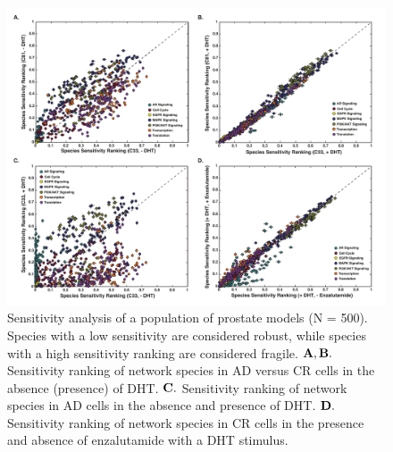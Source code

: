 \documentclass[12pt]{article}
\begin{document}
\clearpage

\begin{figure}\centering
\includegraphics[width=1.0\textwidth]{./figs/Fig_5_Sensitivity.pdf}
\caption{Sensitivity analysis of a population of prostate models (N = 500). Species with a low sensitivity are considered robust, while species with a high sensitivity ranking are considered fragile. $\bf{A,B.}$ Sensitivity ranking of network species in AD versus CR cells in the absence (presence) of DHT. $\bf{C.}$ Sensitivity ranking of network species in AD cells in the absence and presence of DHT. $\bf{D.}$ Sensitivity ranking of network species in CR cells in the presence and absence of enzalutamide with a DHT stimulus.}
\label{fg:Sensitivity}
\end{figure}

\clearpage
\end{document}
